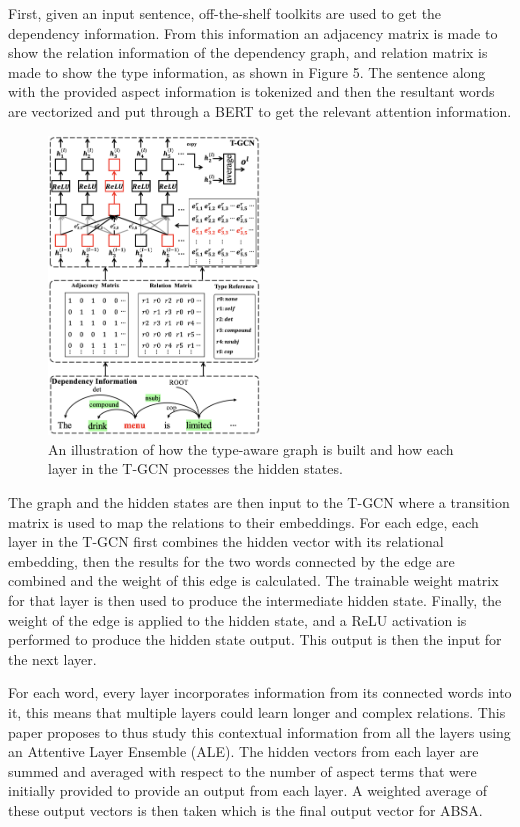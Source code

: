 \documentclass[conference]{IEEEtran}
\begin{document}
First, given an input sentence, off-the-shelf toolkits are used to get the dependency information. From this information an adjacency matrix is made to show the relation information of the dependency graph, and relation matrix is made to show the type information, as shown in Figure 5. The sentence along with the provided aspect information is tokenized and then the resultant words are vectorized and put through a BERT to get the relevant attention information.

\begin{figure}[htbp]
\centerline{\includegraphics[keepaspectratio, width=0.5\textwidth]{pics/5.png}}
\caption{An illustration of how the type-aware graph is built and how each layer in the T-GCN processes the hidden states.}
\label{fig}
\end{figure}

The graph and the hidden states are then input to the T-GCN where a transition matrix is used to map the relations to their embeddings. For each edge, each layer in the T-GCN first combines the hidden vector with its relational embedding, then the results for the two words connected by the edge are combined and the weight of this edge is calculated. The trainable weight matrix for that layer is then used to produce the intermediate hidden state. Finally, the weight of the edge is applied to the hidden state, and a ReLU activation is performed to produce the hidden state output. This output is then the input for the next layer.

For each word, every layer incorporates information from its connected words into it, this means that multiple layers could learn longer and complex relations. This paper proposes to thus study this contextual information from all the layers using an Attentive Layer Ensemble (ALE). The hidden vectors from each layer are summed and averaged with respect to the number of aspect terms that were initially provided to provide an output from each layer. A weighted average of these output vectors is then taken which is the final output vector for ABSA.
\end{document}
